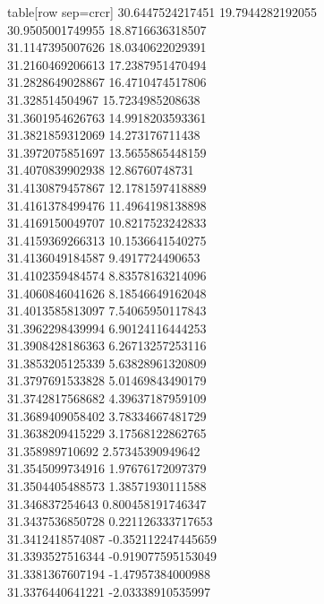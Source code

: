   table[row sep=crcr]{%
30.6447524217451	19.7944282192055\\
30.9505001749955	18.8716636318507\\
31.1147395007626	18.0340622029391\\
31.2160469206613	17.2387951470494\\
31.2828649028867	16.4710474517806\\
31.328514504967	15.7234985208638\\
31.3601954626763	14.9918203593361\\
31.3821859312069	14.273176711438\\
31.3972075851697	13.5655865448159\\
31.4070839902938	12.86760748731\\
31.4130879457867	12.1781597418889\\
31.4161378499476	11.4964198138898\\
31.4169150049707	10.8217523242833\\
31.4159369266313	10.1536641540275\\
31.4136049184587	9.4917724490653\\
31.4102359484574	8.83578163214096\\
31.4060846041626	8.18546649162048\\
31.4013585813097	7.54065950117843\\
31.3962298439994	6.90124116444253\\
31.3908428186363	6.26713257253116\\
31.3853205125339	5.63828961320809\\
31.3797691533828	5.01469843490179\\
31.3742817568682	4.39637187959109\\
31.3689409058402	3.78334667481729\\
31.3638209415229	3.17568122862765\\
31.358989710692	2.57345390949642\\
31.3545099734916	1.97676172097379\\
31.3504405488573	1.38571930111588\\
31.346837254643	0.800458191746347\\
31.3437536850728	0.221126333717653\\
31.3412418574087	-0.352112247445659\\
31.3393527516344	-0.919077595153049\\
31.3381367607194	-1.47957384000988\\
31.3376440641221	-2.03338910535997\\
}
